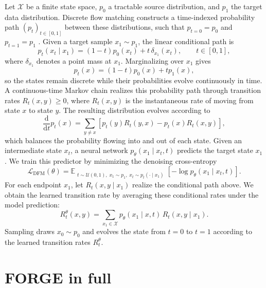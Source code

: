 \documentclass{article}
\begin{document}
Let $\mathcal{X}$ be a finite state space, $p_0$ a tractable source distribution, and $p_1$ the
target data distribution.
Discrete flow matching constructs a time-indexed probability path $(p_t)_{t\in[0,1]}$ between these
distributions, such that $p_{t=0}=p_0$ and $p_{t=1}=p_1$ \citep{qin2025defog}.
Given a target sample $x_1\sim p_1$, the linear conditional path is
\begin{equation}
    p_t(x_t\mid x_1)
    = (1-t)p_0(x_t) + t\,\delta_{x_1}(x_t),
    \qquad t\in[0,1],
\end{equation}
where $\delta_{x_1}$ denotes a point mass at $x_1$.
Marginalizing over $x_1$ gives
\begin{equation}
    p_t(x) = (1-t)p_0(x) + t p_1(x),
\end{equation}
so the states remain discrete while their probabilities evolve continuously in time.
A continuous-time Markov chain realizes this probability path through transition rates
$R_t(x,y)\geq 0$, where $R_t(x,y)$ is the instantaneous rate of moving from state $x$ to state $y$.
The resulting distribution evolves according to
\begin{equation}
    \frac{\mathrm{d}}{\mathrm{d}t}p_t(x)
    = \sum_{y\neq x}
    \left[
        p_t(y)R_t(y,x) - p_t(x)R_t(x,y)
    \right],
\end{equation}
which balances the probability flowing into and out of each state.
Given an intermediate state $x_t$, a neural network $p_\theta(x_1\mid x_t,t)$ predicts the target
state $x_1$.
We train this predictor by minimizing the denoising cross-entropy
\begin{equation}
    \mathcal{L}_{\mathrm{DFM}}(\theta)
    = \mathbb{E}_{\substack{
        t\sim\mathcal{U}(0,1),\;
        x_1\sim p_1,\;
        x_t\sim p_t(\cdot\mid x_1)
    }}
    \left[-\log p_\theta(x_1\mid x_t,t)\right].
\end{equation}
For each endpoint $x_1$, let $R_t(x,y\mid x_1)$ realize the conditional path above.
We obtain the learned transition rate by averaging these conditional rates under the model prediction:
\begin{equation}
    R_t^\theta(x,y)
    = \sum_{x_1\in\mathcal{X}}
    p_\theta(x_1\mid x,t)\,
    R_t(x,y\mid x_1).
\end{equation}
Sampling draws $x_0\sim p_0$ and evolves the state from $t=0$ to $t=1$ according to the learned
transition rates $R_t^\theta$.

\clearpage

\section{FORGE in full}
\label{app:forge}
\end{document}
